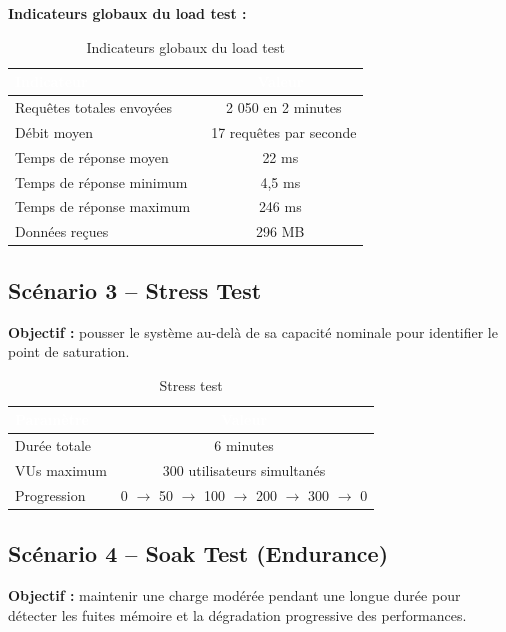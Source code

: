 \documentclass[12pt,a4paper]{report}
\newcommand{\thead}[1]{\cellcolor{tablehead}\textcolor{white}{\textbf{#1}}}
\begin{document}
\textbf{Indicateurs globaux du load test :}

\begin{table}[H]
  \centering
  \caption{Indicateurs globaux du load test}
  \label{tab:tests_load_global}
  \begin{tabularx}{\textwidth}{|l|c|}
    \hline
    \thead{Indicateur} & \thead{Valeur} \\
    \hline
    Requêtes totales envoyées & ~2 050 en 2 minutes \\
    Débit moyen & ~17 requêtes par seconde \\
    Temps de réponse moyen & 22 ms \\
    Temps de réponse minimum & 4,5 ms \\
    Temps de réponse maximum & 246 ms \\
    Données reçues & 296 MB \\
    \hline
  \end{tabularx}
\end{table}

\subsection{Scénario 3 -- Stress Test}

\textbf{Objectif :} pousser le système au-delà de sa capacité nominale
pour identifier le point de saturation.

\begin{table}[H]
  \centering
  \caption{Stress test}
  \label{tab:tests_stress}
  \begin{tabularx}{\textwidth}{|l|c|}
    \hline
    \thead{Paramètre} & \thead{Valeur} \\
    \hline
    Durée totale & 6 minutes \\
    VUs maximum & 300 utilisateurs simultanés \\
    Progression & 0 $\rightarrow$ 50 $\rightarrow$ 100 $\rightarrow$ 200 $\rightarrow$ 300 $\rightarrow$ 0 \\
    \hline
  \end{tabularx}
\end{table}

\subsection{Scénario 4 -- Soak Test (Endurance)}

\textbf{Objectif :} maintenir une charge modérée pendant une longue durée
pour détecter les fuites mémoire et la dégradation progressive des
performances.
\end{document}
